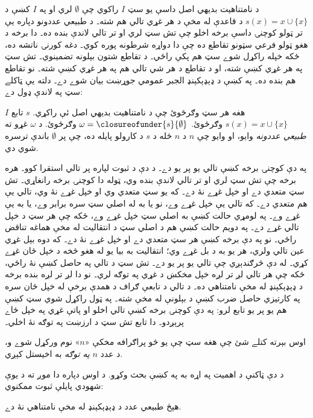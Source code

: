 \documentclass[../../../include/open-logic-section]{subfiles}
\begin{document}
د نامتناهيت بديهي اصل داسې يو سټ $I$ راکوي چې
$\emptyset$ لري او په $I$ کښې د $s(x) = x\cup
\{x\}$ د قاعدې له مخې د هر غړي تالي هم شته۔ د طبيعي عددونو
دپاره يې تر ټولو کوچنۍ داسې برخه اخلو چې تش سټ لري او تر
تالي لاندې بنده ده۔ دا برخه د هغو ټولو فرعي سټونو تقاطع
ده چې دا دواړه شرطونه پوره کوي۔ دغه کورنۍ ناتشه ده، ځکه
خپله راکړل شوے سټ هم پکې راځي۔ د تقاطع شتون بېلونه تضمينوي۔
تش سټ په هر غړي کښې شته، او د تقاطع د هر شي تالي هم په
هر غړي کښې شته۔ نو تقاطع هم بنده ده۔
په  کښې
د ډېډېکېنډ الجبر عمومي جوړښت بيان شوے دے۔ دلته يې ټاکلے
سټ په لاندې ډول دے:
\begin{defn}
$I$ هغه هر سټ وګرځوئ چې د نامتناهيت بديهي اصل ئې راکړي.
$s$ تابع $s(x) = x \cup \{x\}$ وګرځوئ.
$\omega =
\closureofunder{s}{\emptyset}$ وګرځوئ. د $\omega$ غړو ته
\emph{طبيعي عددونه} وايو، او وايو چې $n$ د $n$ ځله د $s$ د
کارولو پايله ده، چې پر $\emptyset$ باندې ترسره شوي دي.
\end{defn}
په دې کوچنۍ برخه کښې تالي يو پر يو دے۔ د دې د ثبوت لپاره
پر تالي استقرا کوو۔ هره برخه چې تش سټ لري او تر تالي
لاندې بنده وي، ټوله دا کوچنۍ برخه رانغاړي۔ تش سټ متعدي
دے او خپل غړے نۀ دے۔
که يو سټ متعدي وي او خپل غړے نۀ وي، تالي يې هم متعدي دے۔
که تالي يې خپل غړے وے، نو يا به له اصلي سټ سره برابر وے،
يا به يې غړے وے۔ په لومړي حالت کښې به اصلي سټ خپل غړے وے،
ځکه چې هر سټ د خپل تالي غړے دے۔ په دويم حالت کښې هم
د اصلي سټ د انتقاليت له مخې هماغه تناقض راځي۔ نو په دې
برخه کښې هر سټ متعدي دے او خپل غړے نۀ دے۔ که دوه بېل غړي
عين تالي ولري، هر يو به د بل غړے وي؛ انتقاليت به بيا يو
له هغو څخه د خپل ځان غړے کړي۔ له دې څرګندېږي چې تالي يو
پر يو دے۔ تش سټ د تالي په حاصل کښې نۀ راځي، ځکه چې هر تالي
لږ تر لږه خپل مخکښ د غړي په توګه لري۔ نو دا لږ تر لږه
بنده برخه د ډېډېکېنډ له مخې نامتناهي ده۔ د تالي د تابعې
ګراف د همدې برخې له خپل ځان سره په کارتيزي حاصل ضرب کښې
د بېلونې له مخې شته۔ په ټول راکړل شوي سټ کښې هم يو پر يو
تابع لرو: په دې کوچنۍ برخه کښې تالي اخلو او پاتې غړي په
خپل ځاے پرېږدو۔ دا تابع تش سټ د ارزښت په توګه نۀ اخلي۔

اوس بېرته کتلے شئ چې هغه سټ چې يو څو پراګرافه مخکې «$n$»
نوم ورکړل شوے و، د عدد $n$ \emph{په توګه} به اخيستل کېږي.

د دې ټاکنې د اهميت په اړه به په  کښې
بحث وکړو. د اوس دپاره دا موږ ته د يوې شهودي پايلې ثبوت ممکنوي:

\begin{prop}
هېڅ طبيعي عدد د ډېډېکېنډ له مخې نامتناهي نۀ دے.
\end{prop}
\end{document}
